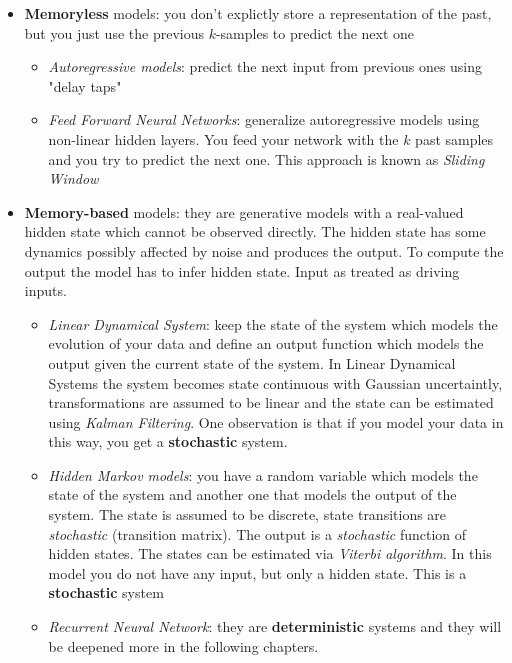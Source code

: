 \begin{itemize}
    \item \textbf{Memoryless} models: you don't explictly store a representation of the past, but you just use the previous $k$-samples to predict the next one
        \begin{itemize}
            \item  \textit{Autoregressive models}: predict the next input from previous ones using "delay taps"
            \item \textit{Feed Forward Neural Networks}: generalize autoregressive models using non-linear hidden layers. You feed your network with the $k$ past samples and you try to predict the next one. This approach is known as \textit{Sliding Window}        \end{itemize}{}
    \item \textbf{Memory-based} models: they are generative models with a real-valued hidden state which cannot be observed directly. The hidden state has some dynamics possibly affected by noise and produces the output. To compute the output the model has to infer hidden state. Input as treated as driving inputs.
        \begin{itemize}
            \item  \textit{Linear Dynamical System}: keep the state of the system which models the evolution of your data and define an output function which models the output given the current state of the system. In Linear Dynamical Systems the system becomes state continuous with Gaussian uncertaintly, transformations are assumed to be linear and the state can be estimated using \textit{Kalman Filtering}. One observation is that if you model your data in this way, you get a \textbf{stochastic} system. 
            \item \textit{Hidden Markov models}: you have a random variable which models the state of the system and another one that models the output of the system. The state is assumed to be discrete, state transitions are \textit{stochastic} (transition matrix). The output is a \textit{stochastic} function of hidden states. The states can be estimated via \textit{Viterbi algorithm}. In this model you do not have any input, but only a hidden state. This is a \textbf{stochastic} system
            \item  \textit{Recurrent Neural Network}: they are \textbf{deterministic} systems and they will be deepened more in the following chapters. 
        \end{itemize}{}
\end{itemize}{} 



